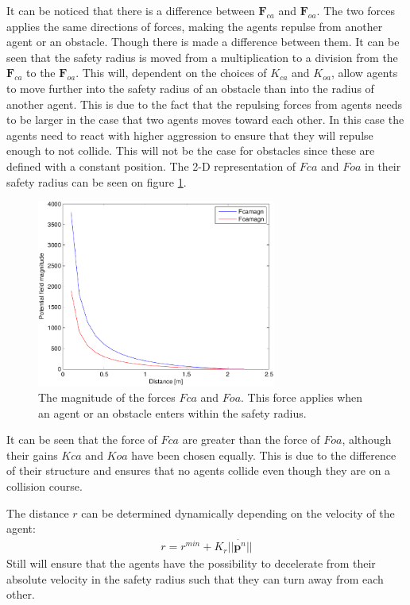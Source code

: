 It can be noticed that there is a difference between $\mathbf{F}_{ca}$ and $\mathbf{F}_{oa}$. The two forces applies the same directions of forces, making the agents repulse from another agent or an obstacle. Though there is made a difference between them. It can be seen that the safety radius is moved from a multiplication to a division from the $\mathbf{F}_{ca}$ to the $\mathbf{F}_{oa}$. This will, dependent on the choices of $K_{ca}$ and $K_{oa}$, allow agents to move further into the safety radius of an obstacle than into the radius of another agent. This is due to the fact that the repulsing forces from agents needs to be larger in the case that two agents moves toward each other. In this case the agents need to react with higher aggression to ensure that they will repulse enough to not collide. This will not be the case for obstacles since these are defined with a constant position. The 2-D representation of $Fca$ and $Foa$ in their safety radius can be seen on figure \ref{fig:fcafoa}.
\begin{figure}[htbp]
  \includegraphics[width=0.7\textwidth]{fig/fcafoa}
  \caption{The magnitude of the forces $Fca$ and $Foa$. This force applies when an agent or an obstacle enters within the safety radius.}
  \label{fig:fcafoa}
\end{figure}
It can be seen that the force of $Fca$ are greater than the force of $Foa$, although their gains $Kca$ and $Koa$ have been chosen equally. This is due to the difference of their structure and ensures that no agents collide even though they are on a collision course.

The distance $r$ can be determined
dynamically depending on the velocity of the agent:
\begin{align}
r = r^{min} + K_r||\dot{\mathbf{p}^n}||
\end{align}
Still will ensure that the agents have the possibility to decelerate from their absolute velocity in the safety radius such that they can turn away from each other.


